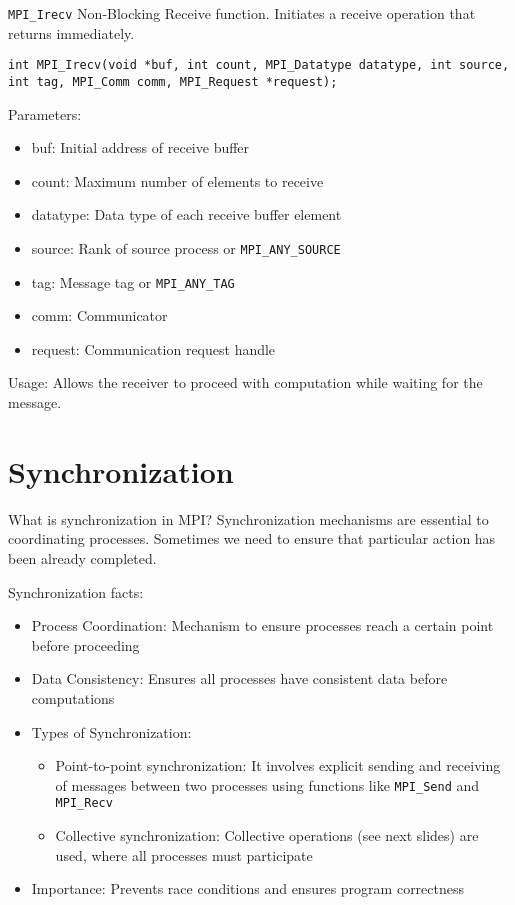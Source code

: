 \documentclass{beamer}
\begin{document}
\begin{frame}{\texttt{MPI\_Irecv}}
  Non-Blocking Receive function. Initiates a receive operation that returns immediately.

  \texttt{int MPI\_Irecv(void *buf, int count, MPI\_Datatype datatype, int source, int tag, MPI\_Comm comm, MPI\_Request *request);}

  Parameters:

  \begin{itemize}
    \item buf: Initial address of receive buffer
    \item count: Maximum number of elements to receive
    \item datatype: Data type of each receive buffer element
    \item source: Rank of source process or \texttt{MPI\_ANY\_SOURCE}
    \item tag: Message tag or \texttt{MPI\_ANY\_TAG}
    \item comm: Communicator
    \item request: Communication request handle
  \end{itemize}
  Usage: Allows the receiver to proceed with computation while waiting for the message.
\end{frame}

\section{Synchronization}

\begin{frame}{What is synchronization in MPI?}
  Synchronization mechanisms are essential to coordinating processes.
  Sometimes we need to ensure that particular action has been already completed.

  Synchronization facts:

  \begin{itemize}
    \item Process Coordination: Mechanism to ensure processes reach a certain point before proceeding
    \item Data Consistency: Ensures all processes have consistent data before computations
    \item Types of Synchronization:
    \begin{itemize}
      \item Point-to-point synchronization: It involves explicit sending and receiving of messages between two processes using functions like \texttt{MPI\_Send} and \texttt{MPI\_Recv}
      \item Collective synchronization: Collective operations (see next slides) are used, where all processes must participate
    \end{itemize}
    \item Importance: Prevents race conditions and ensures program correctness
  \end{itemize}
\end{frame}
\end{document}
